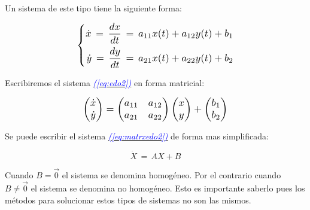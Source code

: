 \documentclass[12pt,a4paper]{report} %
\newcommand{\eref}[1]{\hyperref[#1]{\textcolor{blue}{\textit{(\ref*{#1})}}}}
\begin{document}
	\vspace{0.5cm}\noindent Un sistema de este tipo tiene la siguiente forma:
	
	\begin{equation}
		\label{eq:edo2}
		\scalebox{1.2}{$\displaystyle
			\left\{
			\begin{aligned}
				\dot{x}\,=\,\frac{dx}{dt}\,=\,a_{11}x(t)+a_{12}y(t)+b_1 \\
				\dot{y}\,=\,\frac{dy}{dt}\,=\,a_{21}x(t)+a_{22}y(t)+b_2
			\end{aligned}
			\right.
			$}
	\end{equation}\smallskip
	
	\vspace{0.5cm}\noindent Escribiremos el sistema \eref{eq:edo2} en forma matricial:
	
	\begin{equation}
		\label{eq:matrxedo2}
		\scalebox{1.2}{$\displaystyle
		\begin{pmatrix}
			\dot{x}\\
			\dot{y}\\
		\end{pmatrix} =
		\begin{pmatrix}
			a_{11} & a_{12}\\
		    a_{21} & a_{22}\\
		\end{pmatrix} 
		\begin{pmatrix}
			x\\
			y\\
		\end{pmatrix} + 
		\begin{pmatrix}
			b_1\\
			b_2\\
		\end{pmatrix}
		$}
	\end{equation} \smallskip
	
	\vspace{0.5cm}\noindent Se puede escribir el sistema \eref{eq:matrxedo2} de forma mas simplificada:
	
	\begin{equation}
		\label{eq:sisautonomo}
		\dot{X}\,=\,AX+B
	\end{equation}\smallskip
	
	Cuando $B=\vec{0}$ el sistema se denomina homogéneo. Por el contrario cuando $B\neq\vec{0}$ el sistema se denomina no homogéneo. Esto es importante saberlo pues los métodos para solucionar estos tipos de sistemas no son las mismos.
	
\end{document}
